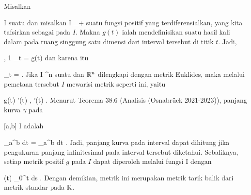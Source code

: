 {

Misalkan

\mavergleichskette
{\vergleichskette
{ I
}
{ \subseteq }{ \R
}
{  }{
}
{    }{
}
{   }{
}
}
{}{}{}
suatu
dan misalkan
 { I } {\R_+
} {}
suatu fungsi positif yang terdiferensialkan, yang kita tafsirkan sebagai
pada $I$. Makna $g(t)$ ialah mendefinisikan suatu hasil kali dalam pada ruang singgung satu dimensi dari interval tersebut di titik $t$. Jadi,

\mavergleichskettedisp
{\vergleichskette
{ \left{}  ,  1  \right\rangle_t
}
{ =} { g(t)
}
{ } {
}
{ } {
}
{ } {
}
}
{}{}{}
dan karena itu

\mavergleichskettedisp
{\vergleichskette
{  \Vert_t
}
{ =} { 
}
{ } {
}
{ } {
}
{ } {
}
}
{}{}{.}
Jika
\maabb {\gamma} { I } { \R^n
} {}
suatu
dan ${\mathbb R}^n$ dilengkapi dengan metrik Euklides, maka melalui pemetaan tersebut $I$ mewarisi metrik seperti ini, yaitu

\mavergleichskettedisp
{\vergleichskette
{ g(t)
}
{ } { \left\langle  \gamma'(t) ,  \gamma'(t)  \right\rangle
}
{ } {
}
{ } {
}
{ } {
}
}
{}{}{.}
Menurut
Teorema 38.6 (Analisis (Osnabrück 2021-2023)),
panjang kurva $\gamma$ pada

\mavergleichskette
{\vergleichskette
{ [a,b]
}
{ \subseteq }{ I
}
{  }{
}
{    }{
}
{   }{
}
}
{}{}{}
adalah

\mavergleichskettedisp
{\vergleichskette
{ \int_a^b  \Vert  dt
}
{ =} { \int_a^b    dt
}
{ } {
}
{ } {
}
{ } {
}
}
{}{}{.}
Jadi, panjang kurva pada interval dapat dihitung jika pengukuran panjang infinitesimal pada interval tersebut diketahui. Sebaliknya, setiap metrik positif $g$ pada $I$ dapat diperoleh melalui fungsi
\maabbdisp {\gamma} { I } { \R
} {}
dengan

\mavergleichskettedisp
{\vergleichskette
{ \gamma(t)
}
{ } { \int_0^t  ds
}
{ } {
}
{ } {
}
{ } {
}
}
{}{}{.}
Dengan demikian, metrik ini merupakan metrik tarik balik dari metrik standar pada ${\mathbb R}$.

}
